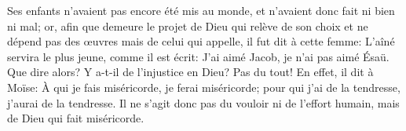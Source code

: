 Ses enfants n’avaient pas encore été mis au monde,
	et n’avaient donc fait ni bien ni mal;
	or, afin que demeure le projet de Dieu qui relève de son choix
	et ne dépend pas des œuvres mais de celui qui appelle,
	il fut dit à cette femme: L’aîné servira le plus jeune,
	comme il est écrit: J’ai aimé Jacob, je n’ai pas aimé Ésaü.
Que dire alors? Y a-t-il de l’injustice en Dieu?
	Pas du tout!
En effet, il dit à Moïse:
	À qui je fais miséricorde, je ferai miséricorde;
	pour qui j’ai de la tendresse, j’aurai de la tendresse.
Il ne s’agit donc pas du vouloir ni de l’effort humain,
	mais de Dieu qui fait miséricorde.
